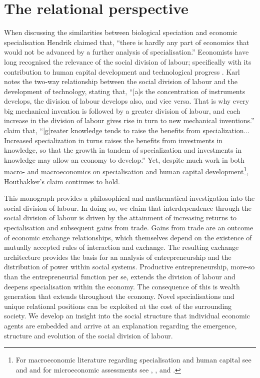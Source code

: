 \chapter{The relational perspective} 
\label{ch:relationalperspective}

When discussing the similarities between biological speciation and economic specialisation Hendrik \citet[p.~182]{Houthakker1956} claimed that, ``there is hardly any part of economics that would not be advanced by a further analysis of specialisation.'' Economists have long recognised the relevance of the social division of labour; specifically with its contribution to human capital development and technological progress \citep{Liang2014}. Karl \citet[p.~139]{Marx1847} notes the two-way relationship between the social division of labour and the development of technology, stating that, ``[a]s the concentration of instruments develops, the division of labour develops also, and vice versa. That is why every big mechanical invention is followed by a greater division of labour, and each increase in the division of labour gives rise in turn to new mechanical inventions.'' \citet[p.~1157]{BeckerMurphy1992} claim that, ``[g]reater knowledge tends to raise the benefits from specialization... Increased specialization in turns raises the benefits from investments in knowledge, so that the growth in tandem of specialization and investments in knowledge may allow an economy to develop.'' Yet, despite much work in both macro- and macroeconomics on specialisation and human capital development\footnote{For macroeconomic literature regarding specialisation and human capital see \citet{Rosen1983} and \citet{Lucas1988} and for microeconomic assessments see \citet{YangBorland1991}, \citet{YangShi1992}, and \citet{ChengYang2004}.}, Houthakker's claim continues to hold.

This monograph provides a philosophical and mathematical investigation into the social division of labour. In doing so, we claim that interdependence through the social division of labour is driven by the attainment of increasing returns to specialisation and subsequent gains from trade. Gains from trade are an outcome of economic exchange relationships, which themselves depend on the existence of mutually accepted rules of interaction and exchange. The resulting exchange architecture provides the basis for an analysis of entrepreneurship and the distribution of power within social systems. Productive entrepreneurship, more-so than the entrepreneurial function per se, extends the division of labour and deepens specialisation within the economy. The consequence of this is wealth generation that extends throughout the economy. Novel specialisations and unique relational positions can be exploited at the cost of the surrounding society. We develop an insight into the social structure that individual economic agents are embedded and arrive at an explanation regarding the emergence, structure and evolution of the social division of labour. 

